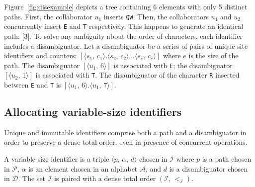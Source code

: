 Figure~\ref{fig:disexample} depicts a tree containing 6 elements with only 5
distinct paths. First, the collaborator $u_1$ inserts \texttt{QW}.  Then, the
collaborators $u_1$ and $u_2$ concurrently insert \texttt{E} and \texttt{T}
respectively. This happens to generate an identical path: [$3$]. To solve any
ambiguity about the order of characters, each identifier includes a
disambiguator.  Let a disambiguator be a series of pairs of unique site
identifiers and counters:
$[\langle s_1,\, c_1 \rangle.\langle s_2,\, c_2 \rangle \ldots \langle s_e,\,
c_e \rangle]$
where $e$ is the size of the path.  The disambiguator
$[\langle u_1,\, 6\rangle]$ is associated with \texttt{E}; the disambiguator
$[\langle u_2,\, 1\rangle]$ is associated with \texttt{T}. The disambiguator of
the character \texttt{R} inserted between \texttt{E} and \texttt{T} is
$[\langle u_1,\, 6\rangle.\langle u_1,\, 7\rangle]$.

\subsection{Allocating variable-size identifiers}

Unique and immutable identifiers comprise both a path and a disambiguator in
order to preserve a dense total order, even in presence of concurrent
operations.

\begin{definition}
  A variable-size identifier is a triple $\langle p,\, \alpha,\, d \rangle$
  chosen in $\mathcal{I}$ where $p$ is a path chosen in $\mathcal{P}$, $\alpha$
  is an element chosen in an alphabet $\mathcal{A}$, and $d$ is a disambiguator
  chosen in $\mathcal{D}$. The set $\mathcal{I}$ is paired with a dense total
  order $(\mathcal{I},\,<_\mathcal{I})$.
\end{definition}

